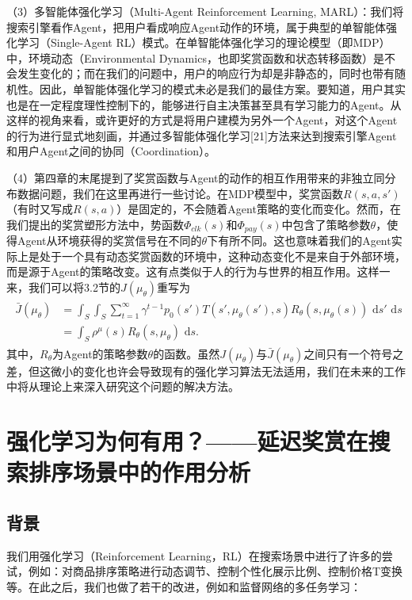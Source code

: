 （3）多智能体强化学习（Multi-Agent Reinforcement Learning, MARL）：我们将搜索引擎看作Agent，把用户看成响应Agent动作的环境，属于典型的单智能体强化学习（Single-Agent RL）模式。在单智能体强化学习的理论模型（即MDP）中，环境动态（Environmental Dynamics，也即奖赏函数和状态转移函数）是不会发生变化的；而在我们的问题中，用户的响应行为却是非静态的，同时也带有随机性。因此，单智能体强化学习的模式未必是我们的最佳方案。要知道，用户其实也是在一定程度理性控制下的，能够进行自主决策甚至具有学习能力的Agent。从这样的视角来看，或许更好的方式是将用户建模为另外一个Agent，对这个Agent的行为进行显式地刻画，并通过多智能体强化学习[21]方法来达到搜索引擎Agent和用户Agent之间的协同（Coordination）。

（4）第四章的末尾提到了奖赏函数与Agent的动作的相互作用带来的非独立同分布数据问题，我们在这里再进行一些讨论。在MDP模型中，奖赏函数$R(s,a,s')$（有时又写成$R(s,a)$）是固定的，不会随着Agent策略的变化而变化。然而，在我们提出的奖赏塑形方法中，势函数$\Phi_{clk}(s)$和$\Phi_{pay}(s)$中包含了策略参数$\theta$，使得Agent从环境获得的奖赏信号在不同的$\theta$下有所不同。这也意味着我们的Agent实际上是处于一个具有动态奖赏函数的环境中，这种动态变化不是来自于外部环境，而是源于Agent的策略改变。这有点类似于人的行为与世界的相互作用。这样一来，我们可以将3.2节的$J(\mu_{\theta})$重写为
\begin{align}
  \begin{split} \bar{J}(\mu_{\theta}) &= \int_S \int_S \sum_{t=1}^{\infty} \gamma^{t-1} p_0(s') T(s', \mu_{\theta}(s'), s) R_{\theta}(s, \mu_{\theta}(s)) \text{ d}s' \text{ d}s \\ &= \int_S \rho^{\mu}(s) R_{\theta}(s, \mu_{\theta}) \text{ d}s. \end{split} 
\end{align}
  其中，$R_{\theta}$为Agent的策略参数$\theta$的函数。虽然$J(\mu_{\theta})$与$\bar{J}(\mu_{\theta})$之间只有一个符号之差，但这微小的变化也许会导致现有的强化学习算法无法适用，我们在未来的工作中将从理论上来深入研究这个问题的解决方法。




\section{强化学习为何有用？——延迟奖赏在搜索排序场景中的作用分析}
\subsection{背景}
我们用强化学习（Reinforcement Learning，RL）在搜索场景中进行了许多的尝试，例如：对商品排序策略进行动态调节、控制个性化展示比例、控制价格T变换等。在此之后，我们也做了若干的改进，例如和监督网络的多任务学习：

